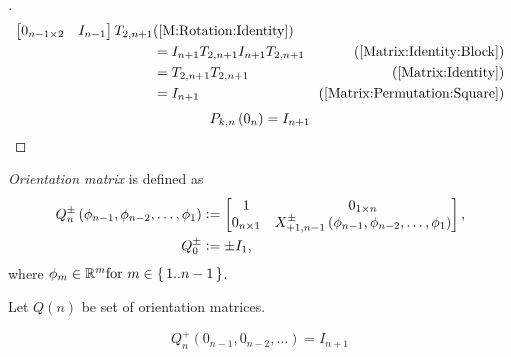 \documentclass[stu, babel, american, biblatex, a4paper, leqno, draftall]{apa7}
\begin{document}
\begin{proof}[]
\begin{align*}
\begin{bmatrix}
            0_{{n-1}\times{2}}                                   & {I}_{n-1} \\
        \end{bmatrix}
        T_{2, n+1} & \text{(\cref{M:Rotation:Identity})} \\
		&=
		I_{n+1}
        T_{2, n+1}
        I_{n+1}
        T_{2, n+1} & \text{(\cref{Matrix:Identity:Block})} \\
		&=
        T_{2, n+1}
        T_{2, n+1} & \text{(\cref{Matrix:Identity})} \\
		&=
        I_{n+1} & \text{(\cref{Matrix:Permutation:Square})}
	\end{align*}
    \begin{equation*}
    	P_{k,n}
    	\left(0_{n}\right)
    	=
    	I_{n+1}
        \qedhere
    \end{equation*}
\end{proof}
\begin{definition}\label{M:Orientation}
    \textit{Orientation matrix} is defined as
    \begin{align*}
        Q^\pm_n\left(\phi_{n-1},\phi_{n-2},\dots,\phi_1\right) & \vcentcolon=
        \begin{bmatrix}
            1 & 0_{1\times n}                                                             \\
            0_{n\times 1} & X^\pm_{+1,n-1}\left(\phi_{n-1},\phi_{n-2},\dots,\phi_1\right) \\
        \end{bmatrix}\text{,}                                              \\
        Q^\pm_0                                                & \vcentcolon= \pm I_1\text{,}
    \end{align*}
    where $\phi_m\in\mathbb{R}^m \text{for } m\in\set{1..n-1}$.
\end{definition}
\begin{definition}\label{M:Orientation:Set}
    Let $Q\left(n\right)$ be set of orientation matrices.
\end{definition}
\begin{corollary}\label{M:Orientation:Set:Identity}
    \begin{equation*}
    	Q^{+}_{n}
    	\left(0_{n-1}, 0_{n-2}, \dots\right)
    	=
    	I_{n+1}
    \end{equation*}
\end{corollary}
\end{document}
